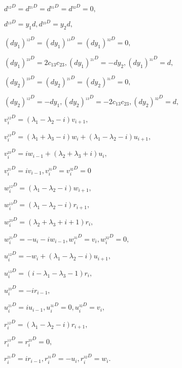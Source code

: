 $ d^{_{12}D} = d^{_{21}D} = d^{_{31}D} = d^{_{32}D} = 0, $

$ d^{_{13}D} = y_1 d, d^{_{23}D} = y_2 d, $
\newline

$ (d y_1)^{_{12}D} = (d y_1)^{_{13}D} = (d y_1)^{_{32}D} = 0, $

$ (d y_1)^{_{23}D} = 2 c_{13} c_{23}, (d y_1)^{_{21}D} = -d y_2, (d y_1)^{_{31}D} = d, $
\newline

$ (d y_2)^{_{23}D} = (d y_2)^{_{21}D} = (d y_2)^{_{31}D} = 0, $

$ (d y_2)^{_{12}D} = -d y_1, (d y_2)^{_{13}D} = -2 c_{13} c_{23}, (d y_2)^{_{32}D} = d, $
\newline

$ v_i^{_{12}D} = (\lambda_1 - \lambda_2 - i)v_{i + 1}, $

$ v_i^{_{13}D} = (\lambda_1 + \lambda_3 - i)w_i + (\lambda_1 - \lambda_2 - i)u_{i + 1}, $

$ v_i^{_{23}D} = i w_{i - 1} + (\lambda_2 + \lambda_3 + i)u_i, $

$ v_i^{_{21}D} = i v_{i - 1}, v_i^{_{31}D} = v_i^{_{32}D} = 0 $
\newline

$ w_i^{_{12}D} = (\lambda_1 - \lambda_2 - i)w_{i + 1}, $

$ w_i^{_{13}D} = (\lambda_1 - \lambda_2 - i)r_{i + 1}, $

$ w_i^{_{23}D} = (\lambda_2 + \lambda_3 + i + 1)r_i, $

$ w_i^{_{21}D} = -u_i - i w_{i - 1}, w_i^{_{31}D} = v_i, w_i^{_{32}D} = 0, $
\newline

$ u_i^{_{12}D} = - w_i + (\lambda_1 - \lambda_2 - i)u_{i + 1}, $

$ u_i^{_{13}D} = (i - \lambda_1 - \lambda_3 - 1)r_i, $

$ u_i^{_{23}D} = -i r_{i - 1}, $

$ u_i^{_{21}D} = i u_{i - 1}, u_i^{_{31}D} = 0, u_i^{_{32}D} = v_i, $
\newline

$ r_i^{_{12}D} = (\lambda_1 - \lambda_2 - i)r_{i + 1}, $

$ r_i^{_{13}D} = r_i^{_{23}D} = 0, $

$ r_i^{_{21}D} = i r_{i - 1}, r_i^{_{31}D} = -u_i, r_i^{_{32}D} = w_i. $
